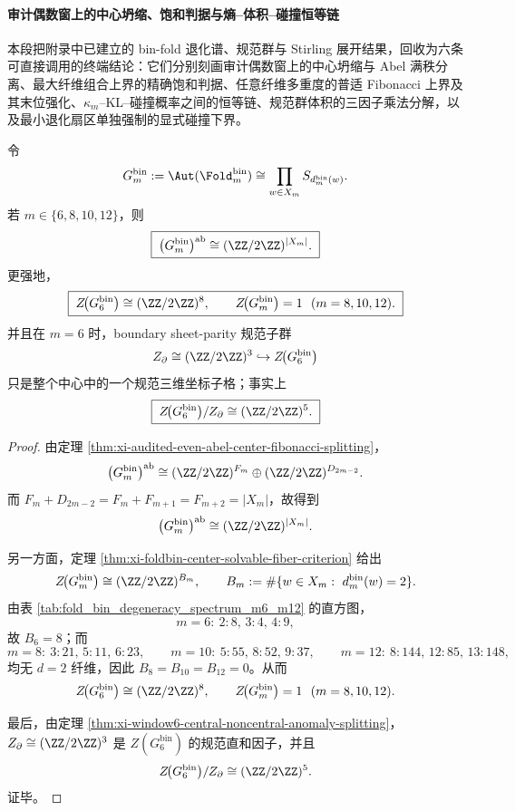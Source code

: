 \paragraph{审计偶数窗上的中心坍缩、饱和判据与熵--体积--碰撞恒等链}
本段把附录中已建立的 bin-fold 退化谱、规范群与 Stirling 展开结果，回收为六条可直接调用的终端结论：它们分别刻画审计偶数窗上的中心坍缩与 Abel 满秩分离、最大纤维组合上界的精确饱和判据、任意纤维多重度的普适 Fibonacci 上界及其末位强化、\(\kappa_m\)--KL--碰撞概率之间的恒等链、规范群体积的三因子乘法分解，以及最小退化扇区单独强制的显式碰撞下界。

\begin{theorem}\label{thm:xi-foldbin-audited-even-center-collapse-abel-full-rank}
令
\[
G_m^{\mathrm{bin}}
:=
\Aut(\Fold_m^{\mathrm{bin}})
\cong
\prod_{w\in X_m}S_{d_m^{\mathrm{bin}}(w)}.
\]
若
\(
m\in\{6,8,10,12\}
\)，则
\[
\boxed{\;
\bigl(G_m^{\mathrm{bin}}\bigr)^{\mathrm{ab}}
\cong
(\ZZ/2\ZZ)^{|X_m|}.\;}
\]
更强地，
\[
\boxed{\;
Z\!\bigl(G_6^{\mathrm{bin}}\bigr)\cong (\ZZ/2\ZZ)^8,\qquad
Z\!\bigl(G_m^{\mathrm{bin}}\bigr)=1\ \ (m=8,10,12).\;}
\]
并且在 \(m=6\) 时，boundary sheet-parity 规范子群
\[
Z_{\partial}\cong (\ZZ/2\ZZ)^3\hookrightarrow Z\!\bigl(G_6^{\mathrm{bin}}\bigr)
\]
只是整个中心中的一个规范三维坐标子格；事实上
\[
\boxed{\;
Z\!\bigl(G_6^{\mathrm{bin}}\bigr)/Z_{\partial}\cong (\ZZ/2\ZZ)^5.\;}
\]
\end{theorem}
\begin{proof}
由定理 \ref{thm:xi-audited-even-abel-center-fibonacci-splitting}，
\[
\bigl(G_m^{\mathrm{bin}}\bigr)^{\mathrm{ab}}
\cong
(\ZZ/2\ZZ)^{F_m}\oplus(\ZZ/2\ZZ)^{D_{2m-2}}.
\]
而
\(
F_m+D_{2m-2}=F_m+F_{m+1}=F_{m+2}=|X_m|
\)，故得到
\[
\bigl(G_m^{\mathrm{bin}}\bigr)^{\mathrm{ab}}\cong (\ZZ/2\ZZ)^{|X_m|}.
\]

另一方面，定理 \ref{thm:xi-foldbin-center-solvable-fiber-criterion} 给出
\[
Z\!\bigl(G_m^{\mathrm{bin}}\bigr)\cong (\ZZ/2\ZZ)^{B_m},
\qquad
B_m:=\#\{w\in X_m:\ d_m^{\mathrm{bin}}(w)=2\}.
\]
由表 \ref{tab:fold_bin_degeneracy_spectrum_m6_m12} 的直方图，
\[
m=6:\ 2:8,\,3:4,\,4:9,
\]
故 \(B_6=8\)；而
\[
m=8:\ 3:21,\,5:11,\,6:23,\qquad
m=10:\ 5:55,\,8:52,\,9:37,\qquad
m=12:\ 8:144,\,12:85,\,13:148,
\]
均无 \(d=2\) 纤维，因此 \(B_8=B_{10}=B_{12}=0\)。从而
\[
Z\!\bigl(G_6^{\mathrm{bin}}\bigr)\cong (\ZZ/2\ZZ)^8,
\qquad
Z\!\bigl(G_m^{\mathrm{bin}}\bigr)=1\ \ (m=8,10,12).
\]

最后，由定理 \ref{thm:xi-window6-central-noncentral-anomaly-splitting}，
\(
Z_{\partial}\cong (\ZZ/2\ZZ)^3
\)
是
\(
Z(G_6^{\mathrm{bin}})
\)
的规范直和因子，并且
\[
Z\!\bigl(G_6^{\mathrm{bin}}\bigr)/Z_{\partial}\cong (\ZZ/2\ZZ)^5.
\]
证毕。
\end{proof}

